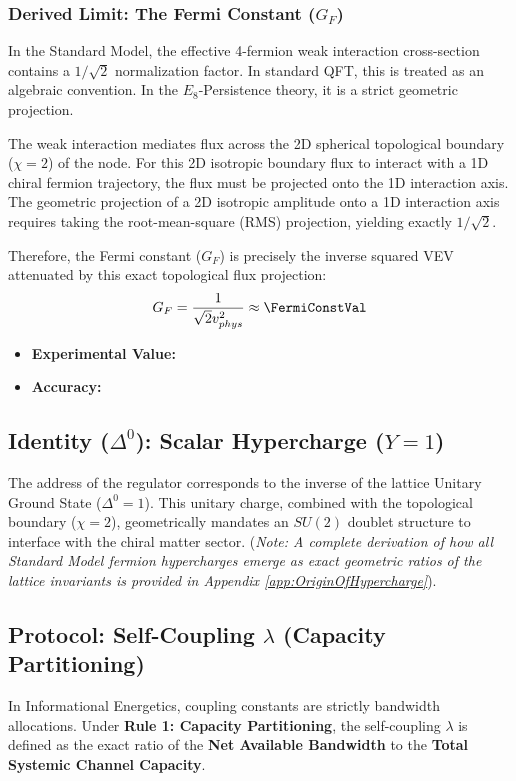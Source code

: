 \subsubsection{Derived Limit: The Fermi Constant (\texorpdfstring{$G_F$}{GF})}
In the Standard Model, the effective 4-fermion weak interaction cross-section contains a $1/\sqrt{2}$ normalization factor. In standard QFT, this is treated as an algebraic convention. In the $E_8$-Persistence theory, it is a strict geometric projection.

The weak interaction mediates flux across the 2D spherical topological boundary ($\chi=2$) of the node. For this 2D isotropic boundary flux to interact with a 1D chiral fermion trajectory, the flux must be projected onto the 1D interaction axis. The geometric projection of a 2D isotropic amplitude onto a 1D interaction axis requires taking the root-mean-square (RMS) projection, yielding exactly $1/\sqrt{2}$.

Therefore, the Fermi constant ($G_F$) is precisely the inverse squared VEV attenuated by this exact topological flux projection:
\begin{equation}
    G_F = \frac{1}{\sqrt{2}v_{phys}^2} \approx \mathbf{\FermiConstVal}
\end{equation}

\begin{itemize}
\item \textbf{Experimental Value:} \FermiConstExperimentalValue
\item \textbf{Accuracy:} \FermiConstAccText
\end{itemize}

\subsection{Identity (\texorpdfstring{$\Delta^0$}{Delta0}): Scalar Hypercharge (\texorpdfstring{$Y=1$}{Y1})} 
The address of the regulator corresponds to the inverse of the lattice Unitary Ground State ($\Delta^0 =1$). This unitary charge, combined with the topological boundary ($\chi=2$), geometrically mandates an $SU(2)$ doublet structure to interface with the chiral matter sector. (\textit{Note: A complete derivation of how all Standard Model fermion hypercharges emerge as exact geometric ratios of the lattice invariants is provided in Appendix \ref{app:OriginOfHypercharge}}).

\subsection{Protocol: Self-Coupling \texorpdfstring{$\lambda$}{lambda} (Capacity Partitioning)}
In Informational Energetics, coupling constants are strictly bandwidth allocations. Under \textbf{Rule 1: Capacity Partitioning}, the self-coupling $\lambda$ is defined as the exact ratio of the \textbf{Net Available Bandwidth} to the \textbf{Total Systemic Channel Capacity}.

